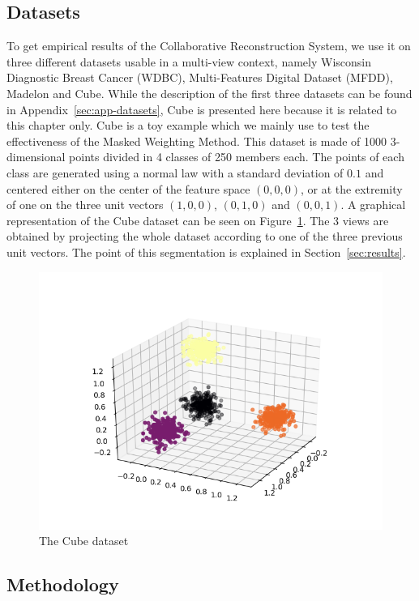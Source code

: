 	\subsection{Datasets}
\label{sec:datasets}
To get empirical results of the Collaborative Reconstruction System, we use it on three different datasets usable in a multi-view context, namely Wisconsin Diagnostic Breast Cancer (WDBC), Multi-Features Digital Dataset (MFDD), Madelon and Cube. While the description of the first three datasets can be found in Appendix~\ref{sec:app-datasets}, Cube is presented here because it is related to this chapter only.
        Cube is a toy example which we mainly use to test the effectiveness of the Masked Weighting Method. This dataset is made of 1000 3-dimensional points divided in 4 classes of 250 members each. The points of each class are generated using a normal law with a standard deviation of $0.1$ and centered either on the center of the feature space $(0,0,0)$, or at the extremity of one on the three unit vectors $(1,0,0)$, $(0,1,0)$ and $(0,0,1)$. A graphical representation of the Cube dataset can be seen on Figure~\ref{fig:cube}. The 3 views are obtained by projecting the whole dataset according to one of the three previous unit vectors. The point of this segmentation is explained in Section~\ref{sec:results}.

    \begin{figure}[h]
        \centering
        \includegraphics[scale=.7]{img/data}
        \caption{The Cube dataset}
\label{fig:cube}
    \end{figure}
	
	\subsection{Methodology}
\label{sec:methodo}

